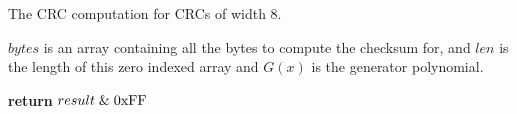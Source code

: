 \begin{algorithm}[H]
  \caption{The CRC computation for CRCs of width 8.}
  \label{alg:crc8-comp}
  \begin{algorithmic}[1]
    \Require  $bytes$ is an array containing all the bytes to compute the
    checksum for, and $len$ is the length of this zero indexed array
    and $G(x)$ is the generator polynomial.



        \Else
        \EndIf
      \EndRepeatn

    \EndForEach

    \State \textbf{return}  $result \mathrel{\&} \mathrm{0xFF}$
    \EndFunction

  \end{algorithmic}
\end{algorithm}




\cite{gailly96:_zlib_compr_data_format_specif}
